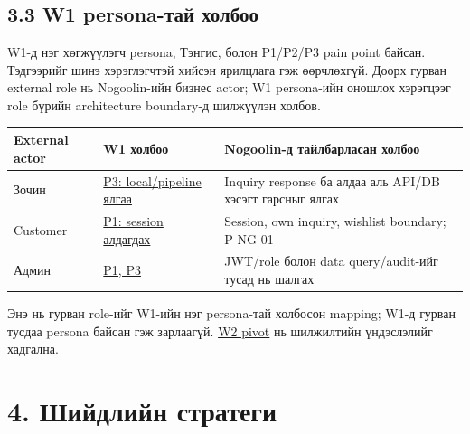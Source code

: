 \documentclass[
  mongolian,
]{article}
\begin{document}
\subsection{3.3 W1 persona-тай
холбоо}\label{w1-persona-ux442ux430ux439-ux445ux43eux43bux431ux43eux43e}

W1-д нэг хөгжүүлэгч persona, Тэнгис, болон P1/P2/P3 pain point байсан.
Тэдгээрийг шинэ хэрэглэгчтэй хийсэн ярилцлага гэж өөрчлөхгүй. Доорх
гурван external role нь Nogoolin-ийн бизнес actor; W1 persona-ийн
оношлох хэрэгцээг role бүрийн architecture boundary-д шилжүүлэн холбов.

\begin{longtable}[]{@{}
  >{\raggedright\arraybackslash}p{}
  >{\raggedright\arraybackslash}p{}
  >{\raggedright\arraybackslash}p{}@{}}
\toprule\noalign{}
\begin{minipage}[b]{\linewidth}\raggedright
External actor
\end{minipage} & \begin{minipage}[b]{\linewidth}\raggedright
W1 холбоо
\end{minipage} & \begin{minipage}[b]{\linewidth}\raggedright
Nogoolin-д тайлбарласан холбоо
\end{minipage} \\
\midrule\noalign{}
\endhead
\bottomrule\noalign{}
\endlastfoot
Зочин &
\href{https://github.com/Tengis01/Nogoolin/blob/main/docs/ICSI438/sem1/wiki/02_audience_persona.md}{P3:
local/pipeline ялгаа} & Inquiry response ба алдаа аль API/DB хэсэгт
гарсныг ялгах \\
Customer &
\href{https://github.com/Tengis01/Nogoolin/blob/main/docs/ICSI438/sem1/wiki/02_audience_persona.md}{P1:
session алдагдах} & Session, own inquiry, wishlist boundary; P-NG-01 \\
Админ &
\href{https://github.com/Tengis01/Nogoolin/blob/main/docs/ICSI438/sem1/wiki/02_audience_persona.md}{P1,
P3} & JWT/role болон data query/audit-ийг тусад нь шалгах \\
\end{longtable}

Энэ нь гурван role-ийг W1-ийн нэг persona-тай холбосон mapping; W1-д
гурван тусдаа persona байсан гэж зарлаагүй.
\href{https://github.com/Tengis01/Nogoolin/blob/main/docs/ICSI438/sem2/wiki/persona-and-pivot.md}{W2
pivot} нь шилжилтийн үндэслэлийг хадгална.

\section{4. Шийдлийн
стратеги}\label{ux448ux438ux439ux434ux43bux438ux439ux43d-ux441ux442ux440ux430ux442ux435ux433ux438}
\end{document}
